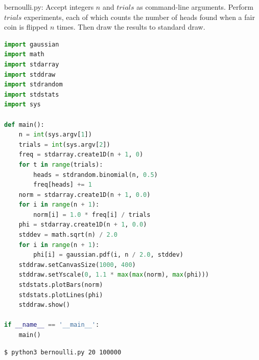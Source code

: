 \documentclass[8pt,a4paper,compress]{beamer}
\begin{document}
\begin{frame}[fragile]
\pause

\begin{framed}
\tiny bernoulli.py: Accept integers $n$ and $trials$ as command-line arguments. Perform $trials$ experiments, each of which counts the number of heads found when a fair coin is flipped $n$ times. Then draw the results to standard draw. 
\end{framed}

\begin{lstlisting}[language=Python]
import gaussian
import math
import stdarray
import stddraw
import stdrandom
import stdstats
import sys

def main():
    n = int(sys.argv[1])
    trials = int(sys.argv[2])
    freq = stdarray.create1D(n + 1, 0)
    for t in range(trials):
        heads = stdrandom.binomial(n, 0.5)
        freq[heads] += 1
    norm = stdarray.create1D(n + 1, 0.0)
    for i in range(n + 1):
        norm[i] = 1.0 * freq[i] / trials
    phi = stdarray.create1D(n + 1, 0.0)
    stddev = math.sqrt(n) / 2.0
    for i in range(n + 1):
        phi[i] = gaussian.pdf(i, n / 2.0, stddev)
    stddraw.setCanvasSize(1000, 400)
    stddraw.setYscale(0, 1.1 * max(max(norm), max(phi)))
    stdstats.plotBars(norm)
    stdstats.plotLines(phi)
    stddraw.show()

if __name__ == '__main__':
    main()
\end{lstlisting}
\end{frame}

\begin{frame}[fragile]
\pause

\begin{minipage}{160pt}
\begin{lstlisting}[language={}]
$ python3 bernoulli.py 20 100000
\end{lstlisting}
\end{minipage}%
\begin{minipage}{140pt}
\hfill {}
\end{minipage}
\end{frame}
\end{document}

